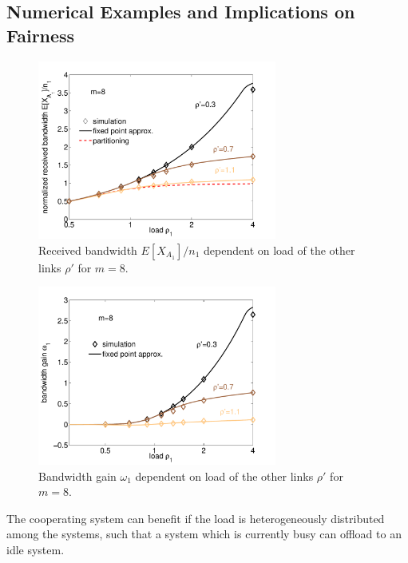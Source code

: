 \subsection{Numerical Examples and Implications on Fairness}\label{sec:aggregation:imbalanced:numerical_examples}

\begin{figure}[tb]
	\centering
	\includegraphics[width=0.7\textwidth]{aggregation/performance_model/figures/fp_bw_m8}
 	\caption{Received bandwidth $E[X_{A_1}]/n_1$ dependent on load of the other links $\rho'$ for $m=8$.}
 	\label{fig:bw_m8}
\end{figure}

\begin{figure}[tb]
	\centering
	\includegraphics[width=0.7\textwidth]{aggregation/performance_model/figures/fp_bwgain_m8}
 	\caption{Bandwidth gain $\omega_1$ dependent on load of the other links $\rho'$ for $m=8$.}
 	\label{fig:bwgain_m8}
\end{figure}

The cooperating system can benefit if the load is heterogeneously distributed among the systems, such that a system which is currently busy can offload to an idle system.

